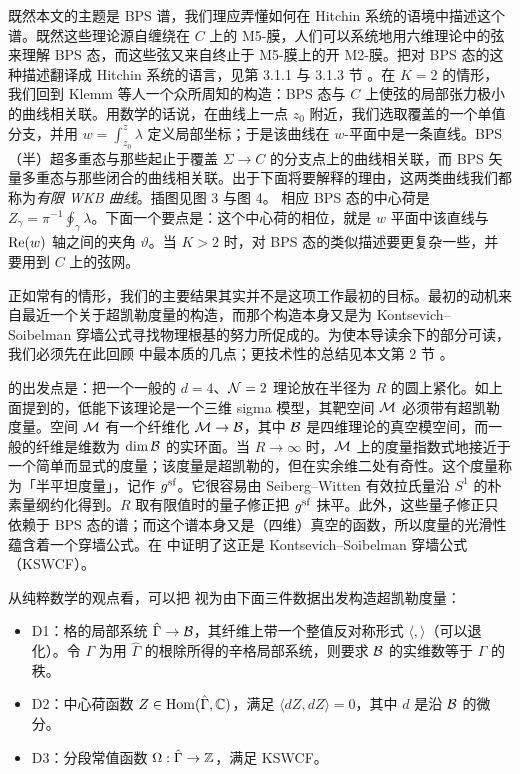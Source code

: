 既然本文的主题是 BPS 谱，我们理应弄懂如何在 Hitchin 系统的语境中描述这个谱。既然这些理论源自缠绕在 $C$ 上的 M5-膜，人们可以系统地用六维理论中的弦来理解 BPS 态，而这些弦又来自终止于 M5-膜上的开 M2-膜\cite{Strominger:1996ac}。把对 BPS 态的这种描述翻译成 Hitchin 系统的语言，见第 3.1.1 与 3.1.3 节%
。在 $K=2$ 的情形，我们回到 Klemm 等人一个众所周知的构造\cite{Klemm:1996bj}：BPS 态与 $C$ 上使弦的局部张力极小的曲线相关联。用数学的话说，在曲线上一点 $z_0$ 附近，我们选取覆盖的一个单值分支，并用 $w = \int^z_{z_0} \lambda$ 定义局部坐标；于是该曲线在 $w$-平面中是一条直线。BPS（半）超多重态与那些起止于覆盖 $\Sigma \to C$ 的分支点上的曲线相关联，而 BPS 矢量多重态与那些闭合的曲线相关联。出于下面将要解释的理由，这两类曲线我们都称为\emph{有限 WKB 曲线}。插图见图 3 与图 4。%
相应 BPS 态的中心荷是 $Z_\gamma = \pi^{-1} \oint_{\gamma} \lambda$。下面一个要点是：这个中心荷的相位，就是 $w$ 平面中该直线与 ${\rm Re}(w)$ 轴之间的夹角 $\vartheta$。当 $K>2$ 时，对 BPS 态的类似描述要更复杂一些，并要用到 $C$ 上的弦网。

正如常有的情形，我们的主要结果其实并不是这项工作最初的目标。最初的动机来自最近一个关于超凯勒度量的构造\cite{Gaiotto:2008cd}，而那个构造本身又是为 Kontsevich–Soibelman 穿墙公式\cite{ks1}寻找物理根基的努力所促成的。为使本导读余下的部分可读，我们必须先在此回顾 \cite{Gaiotto:2008cd} 中最本质的几点；更技术性的总结见本文第 2 节%
。

\cite{Gaiotto:2008cd} 的出发点是：把一个一般的 $d=4$、$\CN=2$ 理论放在半径为 $R$ 的圆上紧化。如上面提到的，低能下该理论是一个三维 sigma 模型，其靶空间 $\CM$ 必须带有超凯勒度量。空间 $\CM$ 有一个纤维化 $\CM \to \CB$，其中 $\CB$ 是四维理论的真空模空间，而一般的纤维是维数为 $\dim \CB$ 的实环面。当 $R\to\infty$ 时，$\CM$ 上的度量指数式地接近于一个简单而显式的度量；该度量是超凯勒的，但在实余维二处有奇性。这个度量称为「半平坦度量」，记作 $g^{\sf}$。它很容易由 Seiberg–Witten 有效拉氏量沿 $S^1$ 的朴素量纲约化得到。$R$ 取有限值时的量子修正把 $g^{\sf}$ 抹平。此外，这些量子修正只依赖于 BPS 态的谱；而这个谱本身又是（四维）真空的函数，所以度量的光滑性蕴含着一个穿墙公式。在 \cite{Gaiotto:2008cd} 中证明了这正是 Kontsevich–Soibelman 穿墙公式（KSWCF）。

从纯粹数学的观点看，可以把 \cite{Gaiotto:2008cd} 视为由下面三件数据出发构造超凯勒度量：

\begin{itemize}

\item D1：格的局部系统 $\hat \Gamma\to \CB$，其纤维上带一个整值反对称形式 $\langle,\rangle$（可以退化）。令 $\Gamma$ 为用 $\hat \Gamma$ 的根除所得的辛格局部系统，则要求 $\CB$ 的实维数等于 $\Gamma$ 的秩。

\item D2：中心荷函数 $Z \in {\rm Hom}(\hat \Gamma, \IC)$，满足 $\langle dZ, dZ \rangle = 0$，其中 $d$ 是沿 $\CB$ 的微分。

\item D3：分段常值函数 $\Omega: \hat \Gamma \to \IZ$，满足 KSWCF。

\end{itemize}


